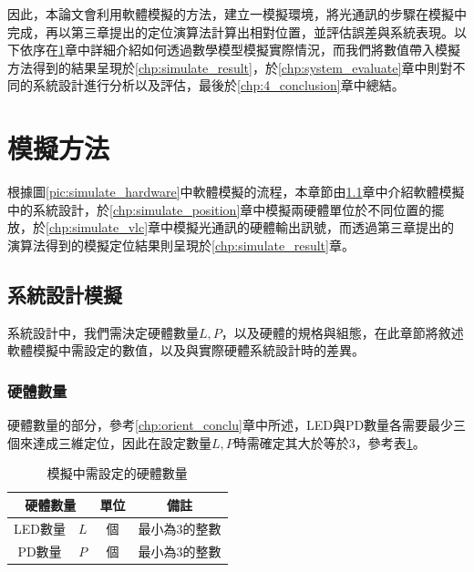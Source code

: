 因此，本論文會利用軟體模擬的方法，建立一模擬環境，將光通訊的步驟在模擬中完成，再以第三章提出的定位演算法計算出相對位置，並評估誤差與系統表現。以下依序在\ref{chp:simulation}章中詳細介紹如何透過數學模型模擬實際情況，而我們將數值帶入模擬方法得到的結果呈現於\ref{chp:simulate_result}，於\ref{chp:system_evaluate}章中則對不同的系統設計進行分析以及評估，最後於\ref{chp:4_conclusion}章中總結。


\section{模擬方法}
\label{chp:simulation}

根據圖\ref{pic:simulate_hardware}中軟體模擬的流程，本章節由\ref{chp:system_design}章中介紹軟體模擬中的系統設計，於\ref{chp:simulate_position}章中模擬兩硬體單位於不同位置的擺放，於\ref{chp:simulate_vlc}章中模擬光通訊的硬體輸出訊號，而透過第三章提出的演算法得到的模擬定位結果則呈現於\ref{chp:simulate_result}章。




\subsection{系統設計模擬}
\label{chp:system_design}

系統設計中，我們需決定硬體數量$L,P$，以及硬體的規格與組態，在此章節將敘述軟體模擬中需設定的數值，以及與實際硬體系統設計時的差異。

\subsubsection{硬體數量}

硬體數量的部分，參考\ref{chp:orient_conclu}章中所述，LED與PD數量各需要最少三個來達成三維定位，因此在設定數量$L,P$時需確定其大於等於3，參考表\ref{tab:para_amount}。

\begin{table}[h]
    \renewcommand{\arraystretch}{1.3}
    \setlength{\arrayrulewidth}{0.15mm}
    \setlength{\doublerulesep}{0.12mm}
    \caption{模擬中需設定的硬體數量}
    \label{tab:para_amount}
    \centering
    \begin{tabular}{|cc|c|c|}
    \hline
    \multicolumn{2}{|c|}{\textbf{硬體數量}}  &\textbf{單位}  &  \textbf{備註}   \\
    \hline
     LED數量 &$L$ & 個 & 最小為3的整數 \\\hline
      PD數量& $P$& 個  & 最小為3的整數 \\\hline
    \end{tabular}
\end{table}
    

